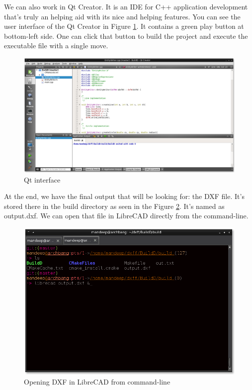 We can also work in Qt Creator. It is an IDE for C++ application development that's truly an helping aid with its nice and helping features. You can see the user interface of the Qt Creator in Figure \ref{fig:qt}. It contains a green play button at bottom-left side. One can click that button to build the project and execute the executable file with a single move.

\begin{figure}
\centering
\includegraphics[scale=0.38]{images/bld2.png}
\caption{Qt interface}
\label{fig:qt}
\end{figure}

At the end, we have the final output that will be looking for: the DXF file. It's stored there in the build directory as seen in the Figure \ref{fig:dxf}. It's named as output.dxf. We can open that file in LibreCAD directly from the command-line.


\begin{figure}
\centering
\includegraphics[scale=0.5]{images/bld4.png}
\caption{Opening DXF in LibreCAD from command-line}
\label{fig:dxf}
\end{figure}

